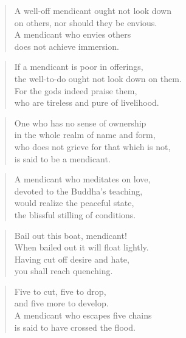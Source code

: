 \documentclass[12pt,openany]{book}%
\begin{document}
\begin{verse}%
A well-off mendicant ought not look down \\
on others, nor should they be envious. \\
A mendicant who envies others \\
does not achieve immersion. 

%
\end{verse}

\begin{verse}%
If a mendicant is poor in offerings, \\
the well-to-do ought not look down on them. \\
For the gods indeed praise them, \\
who are tireless and pure of livelihood. 

%
\end{verse}

\begin{verse}%
One who has no sense of ownership \\
in the whole realm of name and form, \\
who does not grieve for that which is not, \\
is said to be a mendicant. 

%
\end{verse}

\begin{verse}%
A mendicant who meditates on love, \\
devoted to the Buddha’s teaching, \\
would realize the peaceful state, \\
the blissful stilling of conditions. 

%
\end{verse}

\begin{verse}%
Bail out this boat, mendicant! \\
When bailed out it will float lightly. \\
Having cut off desire and hate, \\
you shall reach quenching. 

%
\end{verse}

\begin{verse}%
Five to cut, five to drop, \\
and five more to develop. \\
A mendicant who escapes five chains \\
is said to have crossed the flood. 

%
\end{verse}
\end{document}
